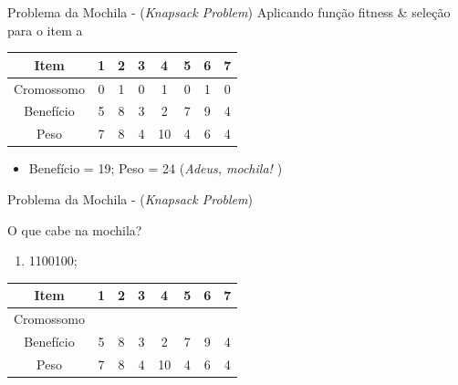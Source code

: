 \documentclass[12pt]{beamer}
\begin{document}
		\begin{frame}{Problema da Mochila - (\textit{Knapsack Problem})}
			\justifying
			Aplicando função fitness \& seleção para o item a \\
			
			\centering
			\vspace{2mm}
			\begin{tabular}{|c|c|c|c|c|c|c|c|}
				\hline
				Item & 1 & 2 & 3 & 4 & 5 & 6 & 7 \\
				\hline
				Cromossomo & 0 & 1 & 0 & 1 & 0 & 1 & 0 \\
				\hline
				Benefício & 5 & 8 & 3 & 2 & 7 & 9 & 4 \\
				\hline
				Peso & 7 & 8 & 4 & 10 & 4 & 6 & 4 \\
				\hline
			\end{tabular}
			
			\vspace{2mm}
			\begin{itemize}
				\item [a)] Benefício = 19; Peso = 24 (\textit{Adeus, mochila! \textcolor{red}{\texttimes}})
			\end{itemize}
		\end{frame}
		
		\begin{frame}{Problema da Mochila - (\textit{Knapsack Problem})}
			\begin{block}{O que cabe na mochila?}
				\begin{enumerate}
					\item [b)] 1100100;
					
				\end{enumerate}
			\end{block}
			\vspace{2mm}
			
			\centering
			\begin{tabular}{|c|c|c|c|c|c|c|c|}
				\hline
				Item & 1 & 2 & 3 & 4 & 5 & 6 & 7 \\
				\hline
				Cromossomo &  &  &  &  &  &  &  \\
				\hline
				Benefício & 5 & 8 & 3 & 2 & 7 & 9 & 4 \\
				\hline
				Peso & 7 & 8 & 4 & 10 & 4 & 6 & 4 \\
				\hline
			\end{tabular}
			\vspace{2mm}
			
			\begin{itemize}
			\end{itemize}
		\end{frame}
	
\end{document}

